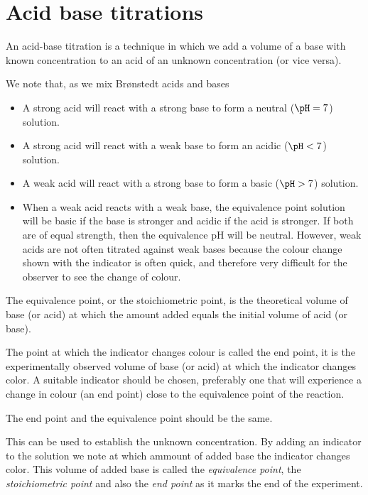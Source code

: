 \documentclass[../mit-general-chemistry.tex]{subfiles}
\begin{document}
\section{Acid base titrations}


An acid-base titration is a technique in which we add a volume of a
base with known concentration to an acid of an unknown concentration
(or vice versa).

We note that, as we mix Brønstedt acids and bases

\begin{itemize}
\item A strong acid will react with a strong base to form a neutral
  ($\pH = 7$) solution.
\item A strong acid will react with a weak base to form an acidic
  ($\pH < 7$) solution.
\item A weak acid will react with a strong base to form a basic ($\pH
  > 7$) solution.
\item When a weak acid reacts with a weak base, the equivalence point
  solution will be basic if the base is stronger and acidic if the
  acid is stronger. If both are of equal strength, then the
  equivalence pH will be neutral. However, weak acids are not often
  titrated against weak bases because the colour change shown with the
  indicator is often quick, and therefore very difficult for the
  observer to see the change of colour.
\end{itemize}

The equivalence point, or the stoichiometric point, is the theoretical
volume of base (or acid) at which the amount added equals the initial
volume of acid (or base).

The point at which the indicator changes colour is called the end
point, it is the experimentally observed volume of base (or acid) at
which the indicator changes color. A suitable indicator should be
chosen, preferably one that will experience a change in colour (an end
point) close to the equivalence point of the reaction.

The end point and the equivalence point should be the same.

This can be used to establish the unknown concentration. By adding an
indicator to the solution we note at which ammount of added base the
indicator changes color. This volume of added base is called the {\em
  equivalence point}, the {\em stoichiometric point} and also the {\em
  end point} as it marks the end of the experiment.
\end{document}
